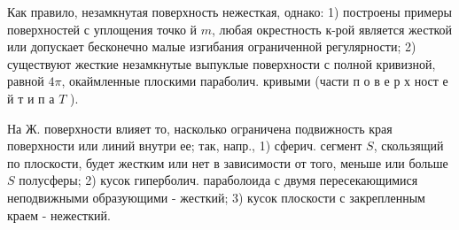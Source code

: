 \documentclass[10pt]{article}
\begin{document}
Как правило, незамкнутая поверхность нежесткая, однако: 1) построены примеры поверхностей с уплощения точко й $m$, любая окрестность к-рой является жесткой или допускает бесконечно малые изгибания ограниченной регулярности; 2) существуют жесткие незамкнутые выпуклые поверхности с полной кривизной, равной $4 \pi$, окаймленные плоскими параболич. кривыми (части п о в е р х ност е й т и п а $T$ ).



На Ж. поверхности влияет то, насколько ограничена подвижность края поверхности или линий внутри ее; так, напр., 1) сферич. сегмент $S$, скользящий по плоскости, будет жестким или нет в зависимости от того, меньше или больше $S$ полусферы; 2) кусок гиперболич. параболоида с двумя пересекающимися неподвижными образующими - жесткий; 3) кусок плоскости с закрепленным краем - нежесткий.
\end{document}
